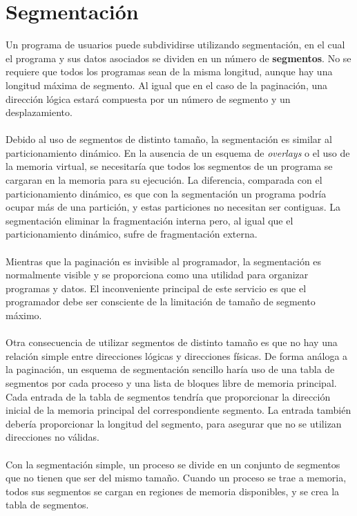 \documentclass[12pt,a4paper]{article}
\begin{document}
\section{Segmentación}
Un programa de usuarios puede subdividirse utilizando segmentación, en el cual el programa y sus datos asociados se dividen en un número de \textbf{segmentos}. No se requiere que todos los programas sean de la misma longitud, aunque hay una longitud máxima de segmento. Al igual que en el caso de la paginación, una dirección lógica estará compuesta por un número de segmento y un desplazamiento.\\\\ 
Debido al uso de segmentos de distinto tamaño, la segmentación es similar al particionamiento dinámico. En la ausencia de un esquema de \textit{overlays} o el uso de la memoria virtual, se necesitaría que todos los segmentos de un programa se cargaran en la memoria para su ejecución. La diferencia, comparada con el particionamiento dinámico, es que con la segmentación un programa podría ocupar más de una partición, y estas particiones no necesitan ser contiguas. La segmentación eliminar la fragmentación interna pero, al igual que el particionamiento dinámico, sufre de fragmentación externa. \\\\ 
Mientras que la paginación es invisible al programador, la segmentación es normalmente visible y se proporciona como una utilidad para organizar programas y datos. El inconveniente principal de este servicio es que el programador debe ser consciente de la limitación de tamaño de segmento máximo. \\\\ 
Otra consecuencia de utilizar segmentos de distinto tamaño es que no hay una relación simple entre direcciones lógicas y direcciones físicas. De forma análoga a la paginación, un esquema de segmentación sencillo haría uso de una tabla de segmentos por cada proceso y una lista de bloques libre de memoria principal. Cada entrada de la tabla de segmentos tendría que proporcionar la dirección inicial de la memoria principal del correspondiente segmento. La entrada también debería proporcionar la longitud del segmento, para asegurar que no se utilizan direcciones no válidas. \\\\ 
Con la segmentación simple, un proceso se divide en un conjunto de segmentos que no tienen que ser del mismo tamaño. Cuando un proceso se trae a memoria, todos sus segmentos se cargan en regiones de memoria disponibles, y se crea la tabla de segmentos.
\end{document}
